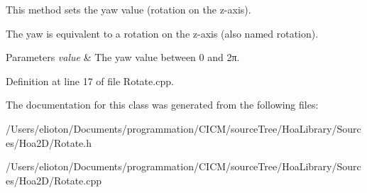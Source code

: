 This method sets the yaw value (rotation on the z-\/axis). 

The yaw is equivalent to a rotation on the z-\/axis (also named rotation).


\begin{DoxyParams}{Parameters}
{\em value} & The yaw value between 0 and 2π. \\
\hline
\end{DoxyParams}


Definition at line 17 of file Rotate.\-cpp.



The documentation for this class was generated from the following files\-:\begin{DoxyCompactItemize}
\item 
/\-Users/elioton/\-Documents/programmation/\-C\-I\-C\-M/source\-Tree/\-Hoa\-Library/\-Sources/\-Hoa2\-D/Rotate.\-h\item 
/\-Users/elioton/\-Documents/programmation/\-C\-I\-C\-M/source\-Tree/\-Hoa\-Library/\-Sources/\-Hoa2\-D/Rotate.\-cpp\end{DoxyCompactItemize}
